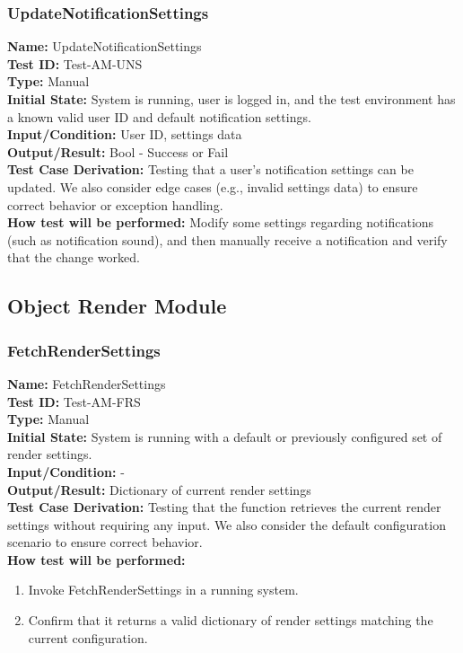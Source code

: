 \documentclass[12pt, titlepage]{article}
\begin{document}
\subsubsection{UpdateNotificationSettings}
\textbf{Name:} UpdateNotificationSettings \label{itm:Test-AM-UNS} \\
\textbf{Test ID:} Test-AM-UNS \\
\textbf{Type:} Manual \\
\textbf{Initial State:} System is running, user is logged in, and the test environment has a known valid user ID and default notification settings. \\
\textbf{Input/Condition:} User ID, settings data \\
\textbf{Output/Result:} Bool - Success or Fail \\
\textbf{Test Case Derivation:} Testing that a user's notification settings can be updated. We also consider edge cases (e.g., invalid settings data) to ensure correct behavior or exception handling.\\
\textbf{How test will be performed:} Modify some settings regarding notifications (such as notification sound), and then manually receive a notification and verify that the change worked. \\

\subsection{Object Render Module}

\subsubsection{FetchRenderSettings}

\textbf{Name:} FetchRenderSettings \label{itm:Test-AM-FRS} \\
\textbf{Test ID:} Test-AM-FRS \\
\textbf{Type:} Manual \\
\textbf{Initial State:} System is running with a default or previously configured set of render settings. \\
\textbf{Input/Condition:} - \\
\textbf{Output/Result:} Dictionary of current render settings \\
\textbf{Test Case Derivation:} Testing that the function retrieves the current render settings without requiring any input. We also consider the default configuration scenario to ensure correct behavior.\\
\textbf{How test will be performed:}
\begin{enumerate}
    \item Invoke FetchRenderSettings in a running system.
    \item Confirm that it returns a valid dictionary of render settings matching the current configuration.
\end{enumerate}
\end{document}
